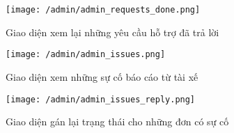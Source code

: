 				\begin{figure}[H]
					\texttt{[image: /admin/admin\_requests\_done.png]}
					\centering
					\caption{Giao diện xem lại những yêu cầu hỗ trợ đã trả lời}
				\end{figure}
			
				\begin{figure}[H]
					\texttt{[image: /admin/admin\_issues.png]}
					\centering
					\caption{Giao diện xem những sự cố báo cáo từ tài xế}
				\end{figure}
			
				\begin{figure}[H]
					\texttt{[image: /admin/admin\_issues\_reply.png]}
					\centering
					\caption{Giao diện gán lại trạng thái cho những đơn có sự cố}
				\end{figure}
				
				